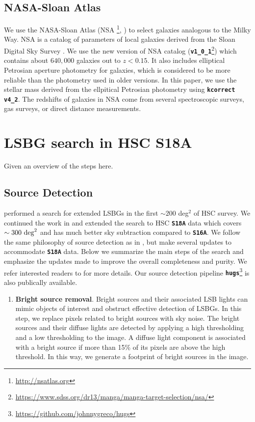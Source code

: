 \documentclass[twocolumn,astrosymb,twocolappendix]{aastex631}
\newcommand{\code}[1]{\textbf{\texttt{#1}}}
\begin{document}
\begin{CJK*}{UTF8}{gbsn}
\subsection{NASA-Sloan Atlas}
We use the NASA-Sloan Atlas (NSA \footnote{\url{http://nsatlas.org}}, \citealt{Blanton2005,Blanton2011}) to select galaxies analogous to the Milky Way. NSA is a catalog of parameters of local galaxies derived from the Sloan Digital Sky Survey \citep[SDSS,][]{York2000}. We use the new version of NSA catalog (\code{v1\_0\_1}\footnote{\url{https://www.sdss.org/dr13/manga/manga-target-selection/nsa/}}) which contains about $640,000$ galaxies out to $z < 0.15$. It also includes elliptical Petrosian aperture photometry for galaxies, which is considered to be more reliable than the photometry used in older versions. In this paper, we use the stellar mass derived from the ellpitical Petrosian photometry using \code{kcorrect v4\_2}. The redshifts of galaxies in NSA come from several spectroscopic surveys, gas surveys, or direct distance measurements. 



\section{LSBG search in HSC S18A}
Given an overview of the steps here.

\subsection{Source Detection}\label{sec:detection}
 performed a search for extended LSBGs in the first $\sim 200$ deg$^2$ of HSC survey. We continued the work in  and extended the search to HSC \code{S18A} data which covers $\sim 300\ \rm{deg}^{2}$ and has much better sky subtraction compared to \code{S16A}. We follow the same philosophy of source detection as in , but make several updates to accommodate \code{S18A} data. Below we summarize the main steps of the search and emphasize the updates made to improve the overall completeness and purity. We refer interested readers to  for more details. Our source detection pipeline \code{hugs}\footnote{\url{https://github.com/johnnygreco/hugs}} is also publically available.

\begin{enumerate}
    \item \textbf{Bright source removal}. Bright sources and their associated LSB lights can mimic objects of interest and obstruct effective detection of LSBGs. In this step, we replace pixels related to bright sources with sky noise. The bright sources and their diffuse lights are detected by applying a high thresholding and a low thresholding to the image. A diffuse light component is associated with a bright source if more than 15\% of its pixels are above the high threshold. In this way, we generate a footprint of bright sources in the image.
    

\end{enumerate}
\end{CJK*}
\end{document}
